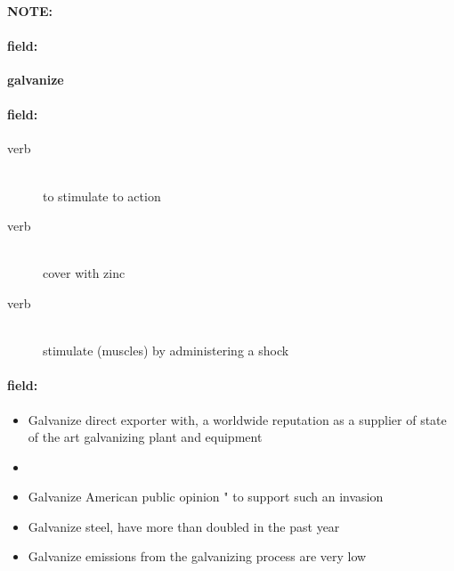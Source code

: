 \documentclass[12pt]{article}
\newenvironment{note}{\paragraph{NOTE:}}{}
\newenvironment{field}{\paragraph{field:}}{}
\begin{document}
\begin{note}
\begin{field}
\textbf{\large galvanize}
\end{field}


\begin{field}
\begin{description}
\item[verb] \hfill \\ 
to stimulate to action

\item[verb] \hfill \\ 
cover with zinc

\item[verb] \hfill \\ 
stimulate (muscles) by administering a shock

\end{description}
\end{field}

\begin{field}
\begin{itemize}
\item Galvanize direct exporter with, a worldwide reputation as a supplier of state of the art galvanizing plant and equipment
\item 
\item Galvanize American public opinion " to support such an invasion
\item Galvanize steel, have more than doubled in the past year
\item Galvanize emissions from the galvanizing process are very low
\end{itemize}
\end{field}
\end{note}
\end{document}
